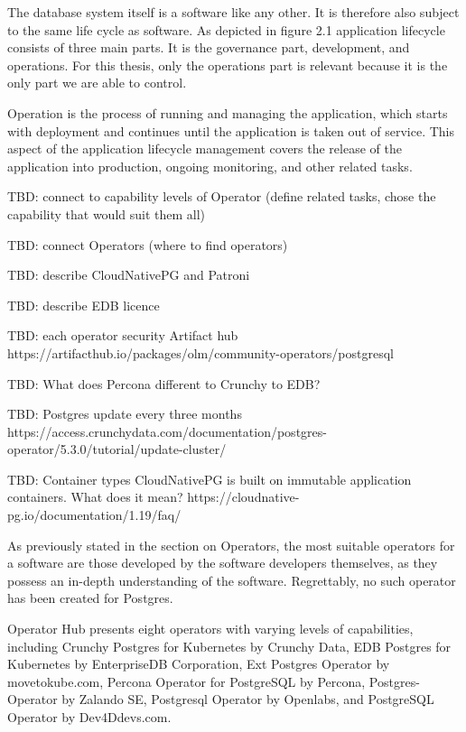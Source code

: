 The database system itself is a software like any other. It is therefore also subject to the same life cycle as software.
As depicted in figure 2.1 application lifecycle consists of three main parts. It is the governance part, development, and operations. For this thesis, only the operations part is relevant because it is the only part we are able to control.

Operation is the process of running and managing the application, which starts with deployment and continues until the application is taken out of service. This aspect of the application lifecycle management covers the release of the application into production, ongoing monitoring, and other related tasks. \cite{ALM}

TBD: connect to capability levels of Operator (define related tasks, chose the capability that would suit them all)



TBD: connect Operators (where to find operators)

TBD: describe CloudNativePG and Patroni

TBD: describe EDB licence

TBD: each operator security Artifact hub https://artifacthub.io/packages/olm/community-operators/postgresql

TBD: What does Percona different to Crunchy to EDB?

TBD: Postgres update every three months https://access.crunchydata.com/documentation/postgres-operator/5.3.0/tutorial/update-cluster/

TBD: Container types CloudNativePG is built on immutable application containers. What does it mean? https://cloudnative-pg.io/documentation/1.19/faq/

As previously stated in the section on Operators, the most suitable operators for a software are those developed by the software developers themselves, as they possess an in-depth understanding of the software. Regrettably, no such operator has been created for Postgres.

Operator Hub presents eight operators with varying levels of capabilities, including Crunchy Postgres for Kubernetes by Crunchy Data, EDB Postgres for Kubernetes by EnterpriseDB Corporation, Ext Postgres Operator by movetokube.com, Percona Operator for PostgreSQL by Percona, Postgres-Operator by Zalando SE, Postgresql Operator by Openlabs, and PostgreSQL Operator by Dev4Ddevs.com.

